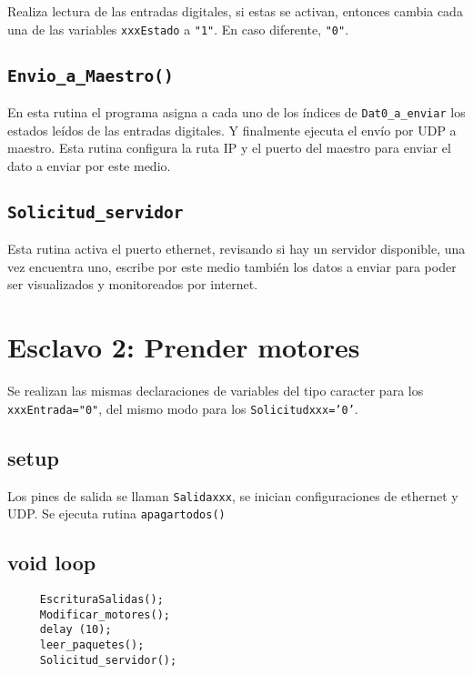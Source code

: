 Realiza lectura de las entradas digitales, si estas se activan, entonces cambia cada una de las variables \texttt{xxxEstado} a \texttt{"1"}. En caso diferente, \texttt{"0"}. 

\subsection{\texttt{Envio\_a\_Maestro()}}

En esta rutina el programa asigna a cada uno de los índices de \texttt{Dat0\_a\_enviar} los estados leídos de las entradas digitales. Y finalmente ejecuta el envío por UDP a maestro. Esta rutina configura la ruta IP y el puerto del maestro para enviar el dato a enviar por este medio.



\subsection{\texttt{Solicitud\_servidor}} 

Esta rutina activa el puerto ethernet, revisando si hay un servidor disponible, una vez encuentra uno, escribe por este medio también los datos a enviar para poder ser visualizados y monitoreados por internet.

\section{Esclavo 2: Prender motores}

Se realizan las mismas declaraciones de variables del tipo caracter para los \texttt{xxxEntrada="0"}, del mismo modo para los \texttt{Solicitudxxx='0'}. 

\subsection{setup}

Los pines de salida se llaman \texttt{Salidaxxx}, se inician configuraciones de ethernet y UDP. Se ejecuta rutina \texttt{apagartodos()}

\subsection{void loop}

\begin{verbatim}
     EscrituraSalidas();    
     Modificar_motores();
     delay (10);                              
     leer_paquetes();
     Solicitud_servidor(); 
\end{verbatim}


